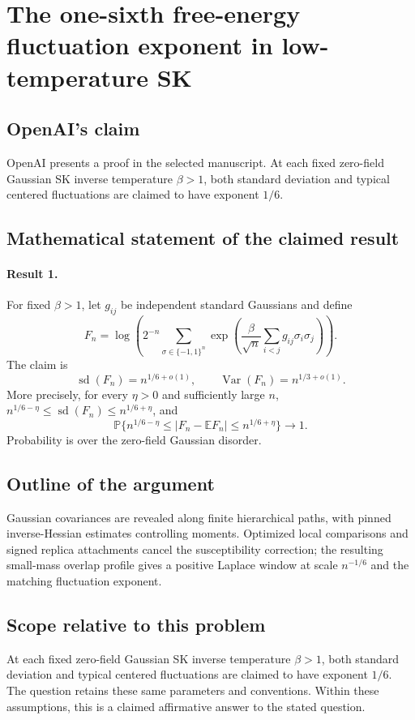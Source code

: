 \documentclass[11pt]{article}
\begin{document}
\section*{The one-sixth free-energy fluctuation exponent in low-temperature SK}

\subsection{OpenAI's claim}
OpenAI presents a proof in the selected manuscript. At each fixed zero-field Gaussian SK inverse temperature $\beta>1$, both standard deviation and typical centered fluctuations are claimed to have exponent $1/6$.

\subsection{Mathematical statement of the claimed result}
\paragraph{Result 1.} For fixed $\beta>1$, let $g_{ij}$ be independent standard Gaussians and define
\[
 F_n=\log\left(2^{-n}\sum_{\sigma\in\{-1,1\}^n}
 \exp\left(\frac\beta{\sqrt n}\sum_{i<j}g_{ij}\sigma_i\sigma_j\right)\right).
\]
The claim is
\[
 \operatorname{sd}(F_n)=n^{1/6+o(1)},\qquad \operatorname{Var}(F_n)=n^{1/3+o(1)}.
\]
More precisely, for every $\eta>0$ and sufficiently large $n$, $n^{1/6-\eta}\le\operatorname{sd}(F_n)\le n^{1/6+\eta}$, and
\[
 \mathbb P\{n^{1/6-\eta}\le|F_n-\mathbb EF_n|\le n^{1/6+\eta}\}\to1.
\]
Probability is over the zero-field Gaussian disorder.

\subsection{Outline of the argument}
Gaussian covariances are revealed along finite hierarchical paths, with pinned inverse-Hessian estimates controlling moments. Optimized local comparisons and signed replica attachments cancel the susceptibility correction; the resulting small-mass overlap profile gives a positive Laplace window at scale $n^{-1/6}$ and the matching fluctuation exponent.

\subsection{Scope relative to this problem}
At each fixed zero-field Gaussian SK inverse temperature $\beta>1$, both standard deviation and typical centered fluctuations are claimed to have exponent $1/6$. The question retains these same parameters and conventions. Within these assumptions, this is a claimed affirmative answer to the stated question.
\end{document}
